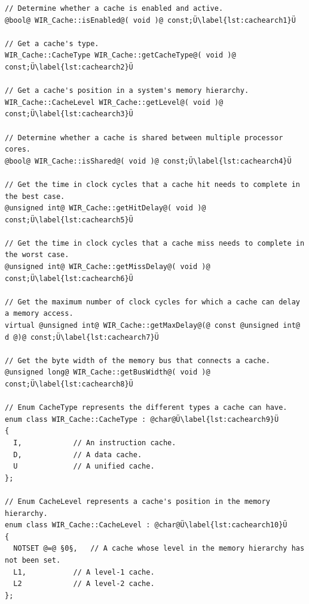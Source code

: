 \begin{lstlisting}[style=code,float=t,caption={Architectural Attributes of Class \texttt{WIR\_Cache}},label=lst:cachearch]
// Determine whether a cache is enabled and active.
@bool@ WIR_Cache::isEnabled@( void )@ const;Ü\label{lst:cachearch1}Ü

// Get a cache's type.
WIR_Cache::CacheType WIR_Cache::getCacheType@( void )@ const;Ü\label{lst:cachearch2}Ü

// Get a cache's position in a system's memory hierarchy.
WIR_Cache::CacheLevel WIR_Cache::getLevel@( void )@ const;Ü\label{lst:cachearch3}Ü

// Determine whether a cache is shared between multiple processor cores.
@bool@ WIR_Cache::isShared@( void )@ const;Ü\label{lst:cachearch4}Ü

// Get the time in clock cycles that a cache hit needs to complete in the best case.
@unsigned int@ WIR_Cache::getHitDelay@( void )@ const;Ü\label{lst:cachearch5}Ü

// Get the time in clock cycles that a cache miss needs to complete in the worst case.
@unsigned int@ WIR_Cache::getMissDelay@( void )@ const;Ü\label{lst:cachearch6}Ü

// Get the maximum number of clock cycles for which a cache can delay a memory access.
virtual @unsigned int@ WIR_Cache::getMaxDelay@(@ const @unsigned int@ d @)@ const;Ü\label{lst:cachearch7}Ü

// Get the byte width of the memory bus that connects a cache.
@unsigned long@ WIR_Cache::getBusWidth@( void )@ const;Ü\label{lst:cachearch8}Ü

// Enum CacheType represents the different types a cache can have.
enum class WIR_Cache::CacheType : @char@Ü\label{lst:cachearch9}Ü
{
  I,            // An instruction cache.
  D,            // A data cache.
  U             // A unified cache.
};

// Enum CacheLevel represents a cache's position in the memory hierarchy.
enum class WIR_Cache::CacheLevel : @char@Ü\label{lst:cachearch10}Ü
{
  NOTSET @=@ §0§,   // A cache whose level in the memory hierarchy has not been set.
  L1,           // A level-1 cache.
  L2            // A level-2 cache.
};
\end{lstlisting}

